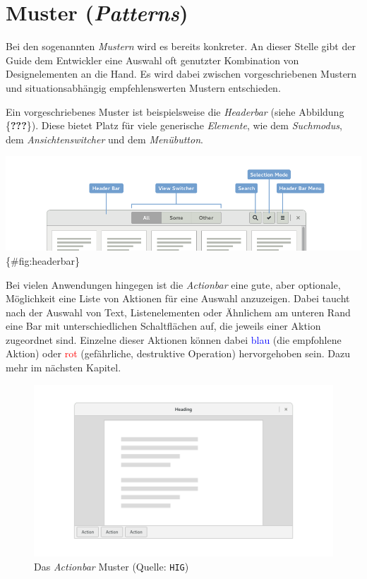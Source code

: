 \documentclass[11pt,ngerman,toc=listof,index=totoc]{scrreprt}
\begin{document}
\section{\texorpdfstring{Muster
(\emph{Patterns})}{Muster (Patterns)}}\label{muster-patterns}

Bei den sogenannten \emph{Mustern} wird es bereits konkreter. An dieser
Stelle gibt der Guide dem Entwickler eine Auswahl oft genutzter
Kombination von Designelementen an die Hand. Es wird dabei zwischen
vorgeschriebenen Mustern und situationsabhängig empfehlenswerten Mustern
entschieden.

Ein vorgeschriebenes Muster ist beispielsweise die \emph{Headerbar}
(siehe Abbildung \{\textbf{???}\}). Diese bietet Platz für viele
generische \emph{Elemente}, wie dem \emph{Suchmodus}, dem
\emph{Ansichtenswitcher} und dem \emph{Menübutton}.

\includegraphics{docs/pics/headerbar.png} \{\#fig:headerbar\}

Bei vielen Anwendungen hingegen ist die \emph{Actionbar} eine gute, aber
optionale, Möglichkeit eine Liste von Aktionen für eine Auswahl
anzuzeigen. Dabei taucht nach der Auswahl von Text, Listenelementen oder
Ähnlichem am unteren Rand eine Bar mit unterschiedlichen Schaltflächen
auf, die jeweils einer Aktion zugeordnet sind. Einzelne dieser Aktionen
können dabei \textcolor{blue}{blau} (die empfohlene Aktion) oder
\textcolor{red}{rot} (gefährliche, destruktive Operation) hervorgehoben
sein. Dazu mehr im nächsten Kapitel.

\begin{figure}[htbp]
\centering
\includegraphics{docs/pics/actionbar.png}
\caption{Das \emph{Actionbar} Muster (Quelle: \texttt{HIG})}
\end{figure}
\end{document}
